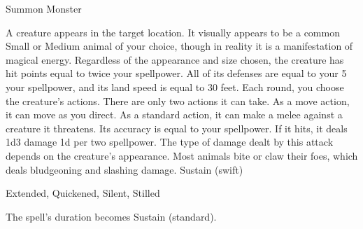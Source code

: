 \begin{spellsection}{Summon Monster}
\begin{spellheader}
\end{spellheader}
\begin{spellcontent}
\begin{spelltargetinginfo}
\end{spelltargetinginfo}
\begin{spelleffects}
\spelleffect
A creature appears in the target location.
It visually appears to be a common Small or Medium animal of your choice, though in reality it is a manifestation of magical energy.
Regardless of the appearance and size chosen, the creature has hit points equal to twice your spellpower.
All of its defenses are equal to your 5 \add your spellpower, and its land speed is equal to 30 feet.
Each round, you choose the creature's actions.
There are only two actions it can take.
As a move action, it can move as you direct.
As a standard action, it can make a melee  against a creature it threatens.
Its accuracy is equal to your spellpower.
If it hits, it deals 1d3 damage \plus1d per two spellpower.
The type of damage dealt by this attack depends on the creature's appearance.
Most animals bite or claw their foes, which deals bludgeoning and slashing damage.
\spelldur Sustain (swift)
\end{spelleffects}
\end{spellcontent}
\begin{spellfooter}
 Extended, Quickened, Silent, Stilled
\end{spellfooter}
\begin{spellsubcontent}
\begin{spellcantrip}
The spell's duration becomes Sustain (standard).
\end{spellcantrip}
\end{spellsubcontent}
\end{spellsection}
